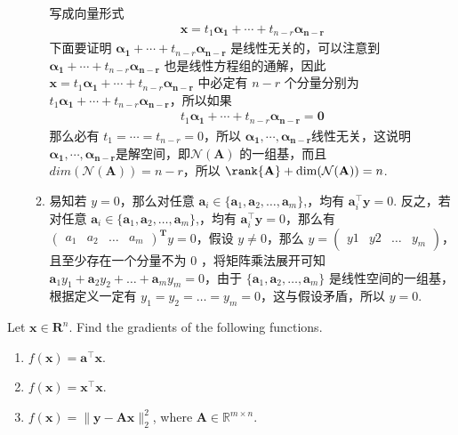 \begin{solution}
\begin{enumerate}
\begin{enumerate}
			写成向量形式
			\begin{align*}
				\mathbf{x} = t_{1} \mathbf{\alpha_{1}}+\cdots+t_{n-r} \mathbf{ \alpha_{n-r}}
			\end{align*}	
			下面要证明 $\mathbf{\alpha_{1}}+\cdots+t_{n-r} \mathbf{ \alpha_{n-r}}$ 是线性无关的，可以注意到 $\mathbf{\alpha_{1}}+\cdots+t_{n-r} \mathbf{ \alpha_{n-r}}$ 也是线性方程组的通解，因此 $\mathbf{x} = t_{1} \mathbf{\alpha_{1}}+\cdots+t_{n-r} \mathbf{ \alpha_{n-r}}$ 中必定有 $ n - r$ 个分量分别为 $ t_{1} \mathbf{\alpha_{1}}+\cdots+t_{n-r} \mathbf{ \alpha_{n-r}}$，所以如果
			\begin{align*}
				t_{1} \mathbf{\alpha_{1}}+\cdots+t_{n-r} \mathbf{ \alpha_{n-r}} = \mathbf{0}
			\end{align*}
			那么必有 $t_{1} = \cdots = t_{n-r} = 0$，所以 $ \mathbf{\alpha_{1}} , \cdots , \mathbf{ \alpha_{n-r}} $线性无关，这说明$ \mathbf{\alpha_{1}} , \cdots , \mathbf{ \alpha_{n-r}} $是解空间，即$\mathcal{N}(\mathbf{A})$ 的一组基，而且 $ dim(\mathcal{N}(\mathbf{A})) = n - r$，所以 $\rank{\mathbf{A}} + \dim(\mathcal{N}(\mathbf{A} ) ) = n$.
			\item 易知若 $ y = 0 $，那么对任意 $\mathbf{a}_i \in \{\mathbf{a}_1,\mathbf{a}_2,\ldots,\mathbf{a}_m\}$,，均有 $\mathbf{a}_i^{\top}\mathbf{y} = 0$. 反之，若对任意 $\mathbf{a}_i \in \{\mathbf{a}_1,\mathbf{a}_2,\ldots,\mathbf{a}_m\}$,，均有 $\mathbf{a}_i^{\top}\mathbf{y} = 0$，那么有 $\begin{pmatrix}
				a_1 & a_2 & \dots & a_m
			\end{pmatrix}^{\mathbf{T}} y = 0 $，假设 $ y \neq 0$，那么 $y = \begin{pmatrix}
				y1 & y2 & \dots & y_m
			\end{pmatrix}$，且至少存在一个分量不为 0 ，将矩阵乘法展开可知 $\mathbf{a}_1y_1 + \mathbf{a}_2y_2 + \dots + \mathbf{a}_my_m = 0$，由于 $\{\mathbf{a}_1,\mathbf{a}_2,\ldots,\mathbf{a}_m\}$ 是线性空间的一组基，根据定义一定有 $y_1 = y_2 = \dots = y_m = 0$，这与假设矛盾，所以 $ y = 0$.
		\end{enumerate}
	\end{enumerate}

\end{solution}

\newpage


\newpage

\begin{exercise} 
	Let $\mathbf{x}\in \mathbf{R}^n$. Find the gradients of the following functions.
	\begin{enumerate}
	    \item $f(\mathbf{x}) = \mathbf{a}^{\top}\mathbf{x}$.
	    \item $f(\mathbf{x}) = \mathbf{x}^{\top}\mathbf{x}$.
	    \item $f(\mathbf{x})=\| \mathbf{y} - \mathbf{A}\mathbf{x} \|_2^2$, where $\mathbf{A}\in\mathbb{R}^{m\times n}$.
	\end{enumerate}
\end{exercise}

